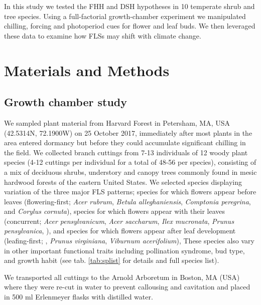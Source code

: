 \documentclass[11pt]{article}\usepackage[]{graphicx}\usepackage[]{color}
\begin{document}
\noindent In this study we tested the FHH and DSH hypotheses in 10 temperate shrub and tree species. Using a full-factorial growth-chamber experiment we manipulated chilling, forcing and photoperiod cues for flower and leaf buds. We then leveraged these data to examine how FLSs may shift with climate change.\\ %

\section*{Materials and Methods}

\subsection*{Growth chamber study}

\noindent We sampled plant material from Harvard Forest in Petersham, MA, USA (42.5314\degree N, 72.1900\degree W) on 25 October 2017, immediately after most plants in the area entered dormancy but before they could accumulate significant chilling in the field. We collected branch cuttings from 7-13 individuals of 12 woody plant species (4-12 cuttings per individual for a total of 48-56 per species), consisting of a mix of deciduous shrubs, understory and canopy trees commonly found in mesic hardwood forests of the eastern United States. We selected species displaying variation of the three major FLS patterns; species for which flowers appear before leaves (flowering-first; \textit{Acer rubrum}, \textit{Betula alleghaniensis}, \textit{Comptonia peregrina}, and \textit{Corylus cornuta}), species for which flowers appear with their leaves (concurrent; \textit{Acer pensylvanicum}, \textit{Acer saccharum}, \textit{Ilex mucronata}, \textit{Prunus pensylvanica}, ), and species for which flowers appear after leaf development (leafing-first; , \textit{Prunus virginiana}, \textit{Viburnum acerifolium}), These species also vary in other important functional traits including pollination syndrome, bud type, and growth habit (see tab. \ref{tab:splist} for details and full species list). 

We transported all cuttings to the Arnold Arboretum in Boston, MA (USA) where they were re-cut in water to prevent callousing and cavitation and placed in 500 ml Erlenmeyer flasks with distilled water.\\ 
\end{document}
